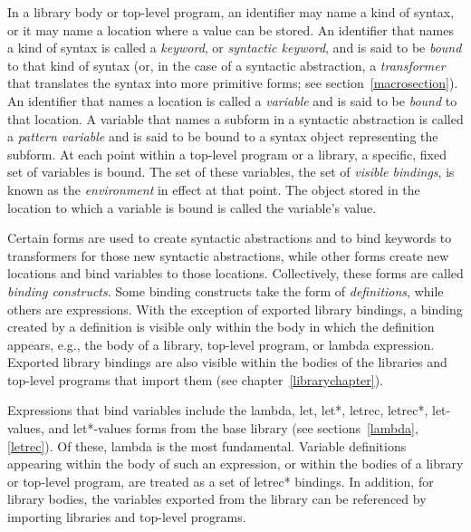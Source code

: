 In a library body or top-level program,
an identifier may name a kind of syntax, or it may name
a location where a value can be stored.  An identifier that names a kind
of syntax is called a {\em keyword}, or {\em syntactic keyword},
and is said to be {\em bound} to that kind of syntax (or, in the case of a
syntactic abstraction, a {\em transformer} that translates the syntax into more
primitive forms; see section~\ref{macrosection}).  An identifier that names a
location is called a {\em variable} and is said to be
{\em bound} to that location.  
A variable that names a subform in a syntactic abstraction is
called a \textit{pattern variable} and is said
to be bound to a syntax object representing the subform.
At each point within a top-level program or a library, a specific, fixed set
of variables is bound.  The set of these variables, the set of \textit{visible
bindings}, is
known as the {\em environment} in effect at that point.  The object
stored in the location to which a variable is bound is called the
variable's value.

Certain forms are used to create syntactic abstractions
and to bind keywords to transformers for those new syntactic abstractions, while other
forms create new locations and bind variables to those
locations.  Collectively, these forms are called {\em binding
  constructs}.
Some binding constructs take the form of
\textit{definitions}, while others are
expressions.
With the exception of exported library bindings, a binding created
by a definition is visible only within the body in which the
definition appears, e.g., the body of a library, top-level program,
or {\cf lambda} expression.
Exported library bindings are also visible within the bodies of
the libraries and top-level programs that import them (see
chapter~\ref{librarychapter}).

Expressions that bind variables include the {\cf lambda},
{\cf let}, {\cf let*}, {\cf letrec}, {\cf letrec*}, {\cf let-values},
and {\cf let*-values} forms from the base library (see
sections~\ref{lambda}, \ref{letrec}).
Of these, {\cf lambda} is the most fundamental.
Variable definitions appearing within the body of 
such an expression, or within the bodies of a library or top-level
program, are treated as a set of
{\cf letrec*} bindings.
In addition, for library bodies, 
the variables exported from the library can be referenced by
importing libraries and top-level programs.

